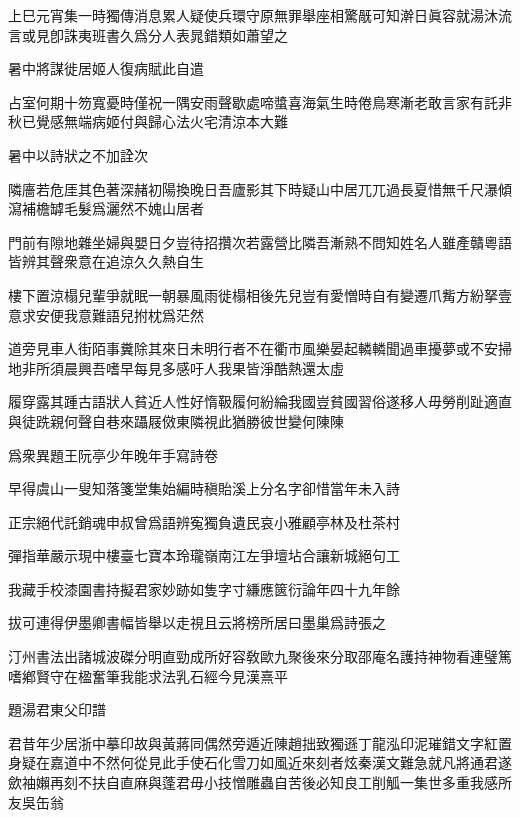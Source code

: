 \documentclass{zhvt-classic-Miya}
\begin{document}
上巳元宵集一時獨傳消息累人疑使兵環守原無罪舉座相驚旤可知澣日眞容就湯沐流言或見卽誅夷班書久爲分人表晁錯類如蕭望之

\begin{fw}暑中將謀徙居姬人復病賦此自遣\end{fw}

占室何期十笏寬憂時僅祝一隅安雨聲歇處啼螿喜海氣生時倦鳥寒漸老敢言家有託非秋已覺感無端病姬付與歸心法火宅清涼本大難

\begin{fw}暑中以詩狀之不加詮次\end{fw}

隣廧若危厓其色著深赭初陽換晚日吾廬影其下時疑山中居兀兀過長夏惜無千尺瀑傾瀉補檐罅毛髮爲灑然不媿山居者

門前有隙地雜坐婦與嬰日夕豈待招攢次若露營比隣吾漸熟不問知姓名人雖產贛粵語皆辨其聲衆意在追涼久久熱自生

樓下置涼榻兒輩爭就眠一朝暴風雨徙榻相後先兒豈有愛憎時自有變遷爪觜方紛拏壹意求安便我意難語兒拊枕爲茫然

道旁見車人街陌事糞除其來日未明行者不在衢市風樂晏起轔轔聞過車擾夢或不安掃地非所須晨興吾嗜早每見多感吁人我果皆淨酷熱還太虛

履穿露其踵古語狀人貧近人性好惰靸履何紛綸我國豈貧國習俗遂移人毋勞削趾適直與徒跣親何聲自巷來躡屐傚東隣視此猶勝彼世變何陳陳

\begin{fw}爲衆異題王阮亭少年晚年手寫詩卷\end{fw}

早得虞山一叟知落箋堂集始編時稹貽溪上分名字卻惜當年未入詩

正宗絕代託銷魂申叔曾爲語辨寃獨負遺民哀小雅顧亭林及杜茶村

彈指華嚴示現中樓臺七寶本玲瓏嶺南江左爭壇坫合讓新城絕句工

我藏手校漆園書持擬君家妙跡如隻字寸縑應篋衍論年四十九年餘

\begin{fw}拔可連得伊墨卿書幅皆舉以走視且云將榜所居曰墨巢爲詩張之\end{fw}

汀州書法出諸城波磔分明直勁成所好容敎歐九聚後來分取邵庵名護持神物看連璧篤嗜鄕賢守在楹奮筆我能求法乳石經今見漢熹平

\begin{fw}題湯君東父印譜\end{fw}

君昔年少居浙中摹印故與黃蔣同偶然旁遁近陳趙拙致獨遜丁龍泓印泥璀錯文字紅置身疑在嘉道中不然何從見此手使石化雪刀如風近來刻者炫秦漢文難急就凡將通君遂歛袖嬾再刻不扶自直麻與蓬君毋小技憎雕蟲自苦後必知良工削觚一集世多重我感所友吳缶翁
\end{document}
